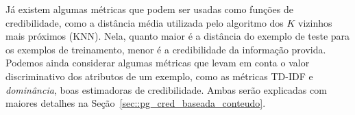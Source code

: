 


Já existem algumas métricas que podem ser usadas como funções de credibilidade, como a distância média utilizada pelo algoritmo dos $K$ vizinhos mais próximos (\textsc{KNN}). Nela, quanto maior é a distância do exemplo de teste para os exemplos de treinamento, menor é a credibilidade da informação provida. Podemos ainda considerar algumas métricas que levam em conta o valor discriminativo dos atributos de um exemplo, como as métricas \textsc{TD-IDF} e \textit{dominância}, boas estimadoras de credibilidade. Ambas serão explicadas com maiores detalhes na Seção~\ref{sec::pg_cred_baseada_conteudo}. %


